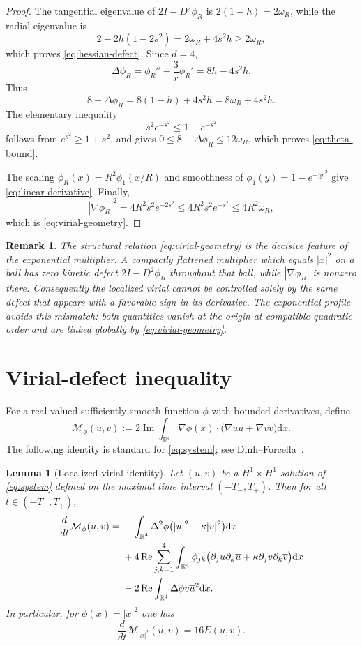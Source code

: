 \documentclass[10pt,a4paper]{amsart}
\numberwithin{equation}{section}
\newtheorem{lemma}[theorem]{Lemma}
\newtheorem{remark}[theorem]{Remark}
\newcommand{\R}{\mathbb{R}}
\newcommand{\dd}{\mathrm{d}x}
\newcommand{\im}{\operatorname{Im}}
\newcommand{\re}{\operatorname{Re}}
\begin{document}
\begin{proof}
The tangential eigenvalue of $2I-D^2\phi_R$ is $2(1-h)=2\omega_R$, while the radial eigenvalue is
\[
 2-2h(1-2s^2)=2\omega_R+4s^2h\ge2\omega_R,
\]
which proves \eqref{eq:hessian-defect}.  Since $d=4$,
\[
 \Delta\phi_R=\phi_R''+\frac3r\phi_R'=8h-4s^2h.
\]
Thus
\[
8-\Delta \phi_R=8(1-h)+4s^2h=8\omega_R+4s^2h.
\]
The elementary inequality
\begin{equation*}
 s^2e^{-s^2}\le1-e^{-s^2}
\end{equation*}
follows from $e^{s^2}\ge1+s^2$, and gives $0\le 8-\Delta \phi_R \le12\omega_R$, which proves \eqref{eq:theta-bound}.

The scaling $\phi_R(x)=R^2\phi_1(x/R)$ and smoothness of $\phi_1(y)=1-e^{-|y|^2}$ give \eqref{eq:linear-derivative}.  Finally,
\[
 |\nabla\phi_R|^2=4R^2s^2e^{-2s^2} \le4R^2s^2e^{-s^2} \le4R^2\omega_R,
\]
which is \eqref{eq:virial-geometry}.
\end{proof}

\begin{remark}\label{rem:why-exp}
The structural relation \eqref{eq:virial-geometry} is the decisive feature of the exponential multiplier.  A compactly flattened multiplier which equals $|x|^2$ on a ball has zero kinetic defect $2I-D^2\phi_R$ throughout that ball, while $|\nabla\phi_R|$ is nonzero there.  Consequently the localized virial cannot be controlled solely by the same defect that appears with a favorable sign in its derivative.  The exponential profile avoids this mismatch: both quantities vanish at the origin at compatible quadratic order and are linked globally by \eqref{eq:virial-geometry}.
\end{remark}

\section{Virial-defect inequality}\label{sec:coercive}
For a real-valued sufficiently smooth function $\phi$ with bounded derivatives, define
\begin{equation}\label{eq:Mphi}
 \mathcal M_\phi(u,v) :=2\im\int_{\R^4}\nabla\phi(x)\cdot
 \big(\nabla u\overline u+\nabla v\overline v\big)\dd.
\end{equation}
The following identity is standard for \eqref{eq:system}; see Dinh--Forcella~\cite[Section 4]{DF}.

\begin{lemma}[Localized virial identity]\label{lem:virial-id}
Let $(u,v)$ be a $H^1\times H^1$ solution of \eqref{eq:system} defined on the maximal time interval $(-T_-,T_+)$. Then for all $t\in (-T_-, T_+)$,
\begin{align}
 \frac{d}{dt}\mathcal M_\phi(u,v)
 ={}&-\int_{\R^4}\Delta^2\phi\big(|u|^2+\kappa|v|^2\big)\dd\label{eq:virial-id}\\
 &+4\re\sum_{j,k=1}^4\int_{\R^4}\phi_{jk}
 \big(\partial_ju \partial_k\overline u + \kappa \partial_jv \partial_k\overline v\big)\dd\notag\\
 &-2\re\int_{\R^4}\Delta \phi v\overline u^{2}\dd.\notag
\end{align}
In particular, for $\phi(x)=|x|^2$ one has
\[
 \frac{d}{dt}\mathcal M_{|x|^2}(u,v)=16E(u,v).
\]
\end{lemma}
\end{document}
